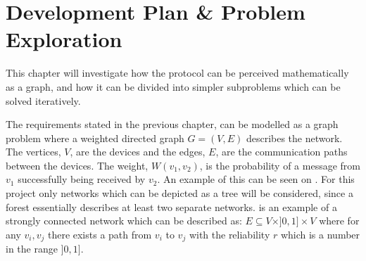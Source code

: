 \chapter{Development Plan \& Problem Exploration}\label{chp:Problems}
This chapter will investigate how the protocol can be perceived mathematically as a graph, and how it can be divided into simpler subproblems which can be solved iteratively.

The requirements stated in the previous chapter, can be modelled as a graph problem where a weighted directed graph $G = (V, E)$ describes the network. 
The vertices, $V$, are the devices and the edges, $E$, are the communication paths between the devices. 
The weight, $W(v_1, v_2)$, is the probability of a message from $v_1$ successfully being received by $v_2$.
An example of this can be seen on .
For this project only networks which can be depicted as a tree will be considered, since a forest essentially describes at least two separate networks.
 is an example of a strongly connected network which can be described as: $E \subseteq V \times ]0,1] \times V$ where for any $v_i, v_j$ there exists a path from $v_i$ to $v_j$ with the reliability $r$ which is a number in the range $]0,1]$.



